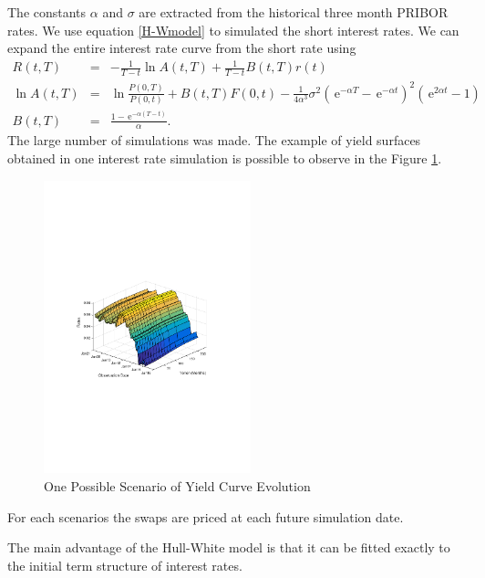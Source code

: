 \documentclass{amsart}
\theoremstyle{definition}\newtheorem{definition}[theorem]{Definition}
\theoremstyle{remark}\newtheorem{remark}[theorem]{Remark}
\newcommand{\e}{\,\mathrm{e}}
\begin{document}
The constants $\alpha$ and $\sigma$ are extracted from the historical three month PRIBOR rates.
We use equation \eqref{H-Wmodel} to simulated the short interest rates.  
We can expand the entire interest rate curve from the short rate using
\begin{eqnarray}
R(t,T)&=&-\frac{1}{T-t}\ln A(t,T)+\frac{1}{T-t}B(t,T)r(t)\\
\ln A(t,T)&=&\ln \frac{P(0,T)}{P(0,t)}+B(t,T)F(0,t)-\frac{1}{4\alpha^3}\sigma^2(\e^{-\alpha T}-\e^{-\alpha t})^2(\e^{2\alpha t}-1)  \nonumber\\
B(t,T)&=&\frac{1-\e^{-\alpha(T-t)}}{\alpha}.\nonumber
\end{eqnarray}
The large number of simulations was made. 
The example of yield surfaces obtained in one interest rate simulation is possible to observe in the Figure \ref{YieldCurveEvolution}.
\begin{figure}[!htbp]
  \centering 
	\includegraphics[width=6cm, clip, trim= 110 270 110 270]{IMG/YieldCurveEvolution.pdf}
  \caption{ One Possible Scenario of Yield Curve Evolution}  \label{YieldCurveEvolution}
\end{figure}
For each scenarios the swaps are priced at each future simulation date. 

The main advantage of the Hull-White model is that it can be fitted exactly to the initial term structure of interest rates.
\end{document}
